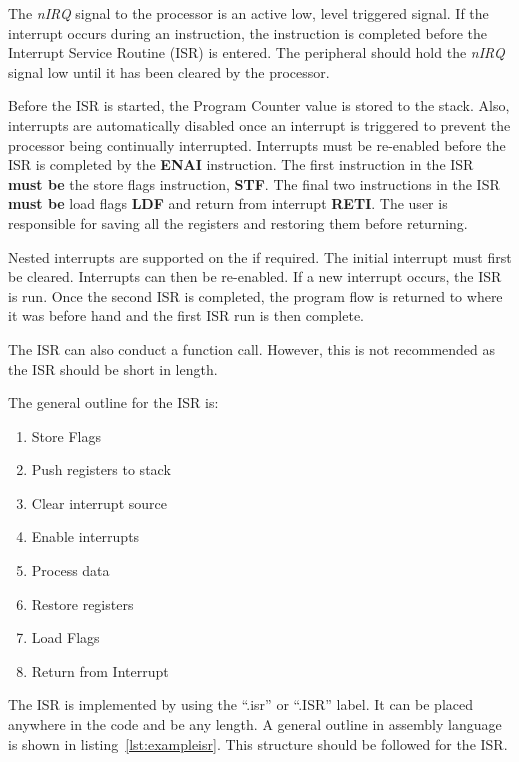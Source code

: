 The \textit{nIRQ} signal to the \samurai{} processor is an active low, level triggered signal.
If the interrupt occurs during an instruction, the instruction is completed before the Interrupt Service Routine (ISR) is entered.
The peripheral should hold the \textit{nIRQ} signal low until it has been cleared by the processor.

Before the ISR is started, the Program Counter value is stored to the stack. 
Also, interrupts are automatically disabled once an interrupt is triggered to prevent the processor being continually interrupted.
Interrupts must be re-enabled before the ISR is completed by the \textbf{ENAI} instruction.
The first instruction in the ISR \textbf{must be} the store flags instruction, \textbf{STF}. 
The final two instructions in the ISR \textbf{must be} load flags \textbf{LDF} and return from interrupt \textbf{RETI}. 
The user is responsible for saving all the registers and restoring them before returning. 

Nested interrupts are supported on the \samurai{} if required. 
The initial interrupt must first be cleared. 
Interrupts can then be re-enabled. 
If a new interrupt occurs, the ISR is run. 
Once the second ISR is completed, the program flow is returned to where it was before hand and the first ISR run is then complete.

The ISR can also conduct a function call. 
However, this is not recommended as the ISR should be short in length.

The general outline for the ISR is:
\begin{enumerate}
\item Store Flags
\item Push registers to stack
\item Clear interrupt source
\item Enable interrupts
\item Process data
\item Restore registers
\item Load Flags
\item Return from Interrupt
\end{enumerate}

The ISR is implemented by using the ``.isr'' or ``.ISR'' label. 
It can be placed anywhere in the code and be any length.
A general outline in assembly language is shown in listing~\ref{lst:exampleisr}. 
This structure should be followed for the ISR.


